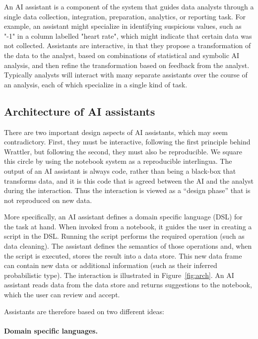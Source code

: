 \documentclass[sigplan,preprint,10pt]{acmart}\settopmatter{printfolios=true,printccs=false,printacmref=false}
\theoremstyle{plain}
\theoremstyle{definition}
\begin{document}
{
An AI assistant is a component
of the system that
guides data analysts through a single data collection, integration, preparation,
analytics, or reporting task.
For example, an assistant might
specialize in identifying suspicious
values, such as "-1" in a column labelled
"heart rate", which might indicate
that certain data was not collected.
Assistants are interactive, in that
they propose a transformation
of the data to the analyst, based on combinations
of statistical and symbolic AI analysis,
and then refine the transformation
based on feedback from the analyst.
Typically analysts will interact with many separate assistants over
the course of an analysis, each of which specialize in a single kind of task.

\subsection{Architecture of AI assistants}

There are two important design aspects of AI assistants, which may seem
contradictory.
 First, they must be interactive, following
 the first principle behind Wrattler, but
 following the second,
 they must also be reproducible.
We square this circle by using the notebook
system as a reproducible interlingua.
The output of an AI assistant is always code, rather
than being a black-box that transforms data,
and it is this code that is agreed between the AI and the analyst during the interaction.
Thus the interaction is viewed as a ``design phase''
that is not reproduced on new data.

More specifically, an AI assistant defines a domain specific language (DSL) for the task at hand. When invoked from
a notebook, it guides the user in creating a script in the DSL. Running the script performs
the required operation (such as data cleaning). The assistant defines the semantics
of those operations and, when the script is executed, stores the result into a data
store. This new data frame can contain new data or additional information (such as their
inferred probabilistic type).
The interaction is illustrated in Figure~\ref{fig:arch}. An AI assistant reads data from the data
store and returns suggestions to the notebook, which the user can review and accept.

Assistants are therefore based on two different ideas:

\paragraph{Domain specific languages.}

}
\end{document}
